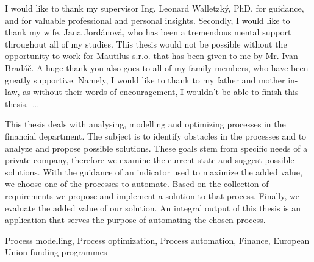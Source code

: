 \documentclass[12pt,oneside]{fithesis2}
\begin{document}
\FrontMatter
\ThesisTitlePage
\begin{ThesisDeclaration}
  \DeclarationText
  \AdvisorName
\end{ThesisDeclaration}
\begin{ThesisThanks}
  I would like to thank my supervisor Ing. Leonard Walletzký, PhD. for guidance, and for valuable professional and personal insights. Secondly, I would like to thank my wife, Jana Jordánová, who has been a tremendous mental support throughout all of my studies. This thesis would not be possible without the opportunity to work for Mautilus s.r.o. that has been given to me by Mr. Ivan Bradáč. A huge thank you also goes to all of my family members, who have been greatly supportive. Namely, I would like to thank to my father and mother in-law, as without their words of encouragement, I wouldn't be able to finish this thesis. \,\dots
\end{ThesisThanks}
\begin{ThesisAbstract}
  This thesis deals with analysing, modelling and optimizing processes in the financial department. The subject is to identify obstacles in the processes and to analyze and propose possible solutions. These goals stem from specific needs of a private company, therefore we examine the current state and suggest possible solutions. With the guidance of an indicator used to maximize the added value, we choose one of the processes to automate. Based on the collection of requirements we propose and implement a solution to that process. Finally, we evaluate the added value of our solution. An integral output of this thesis is an application that serves the purpose of automating the chosen process.
\end{ThesisAbstract}
\begin{ThesisKeyWords}Process modelling, Process optimization, Process automation, Finance, European Union funding programmes
\end{ThesisKeyWords}
\tableofcontents

\MainMatter
\end{document}
